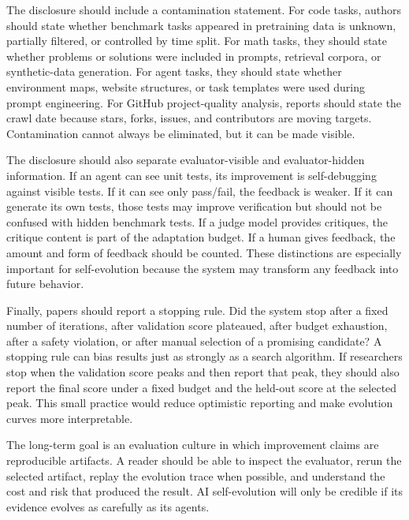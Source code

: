 The disclosure should include a contamination statement. For code tasks, authors should state whether benchmark tasks appeared in pretraining data is unknown, partially filtered, or controlled by time split. For math tasks, they should state whether problems or solutions were included in prompts, retrieval corpora, or synthetic-data generation. For agent tasks, they should state whether environment maps, website structures, or task templates were used during prompt engineering. For GitHub project-quality analysis, reports should state the crawl date because stars, forks, issues, and contributors are moving targets. Contamination cannot always be eliminated, but it can be made visible.

The disclosure should also separate evaluator-visible and evaluator-hidden information. If an agent can see unit tests, its improvement is self-debugging against visible tests. If it can see only pass/fail, the feedback is weaker. If it can generate its own tests, those tests may improve verification but should not be confused with hidden benchmark tests. If a judge model provides critiques, the critique content is part of the adaptation budget. If a human gives feedback, the amount and form of feedback should be counted. These distinctions are especially important for self-evolution because the system may transform any feedback into future behavior.

Finally, papers should report a stopping rule. Did the system stop after a fixed number of iterations, after validation score plateaued, after budget exhaustion, after a safety violation, or after manual selection of a promising candidate? A stopping rule can bias results just as strongly as a search algorithm. If researchers stop when the validation score peaks and then report that peak, they should also report the final score under a fixed budget and the held-out score at the selected peak. This small practice would reduce optimistic reporting and make evolution curves more interpretable.

The long-term goal is an evaluation culture in which improvement claims are reproducible artifacts. A reader should be able to inspect the evaluator, rerun the selected artifact, replay the evolution trace when possible, and understand the cost and risk that produced the result. AI self-evolution will only be credible if its evidence evolves as carefully as its agents.
